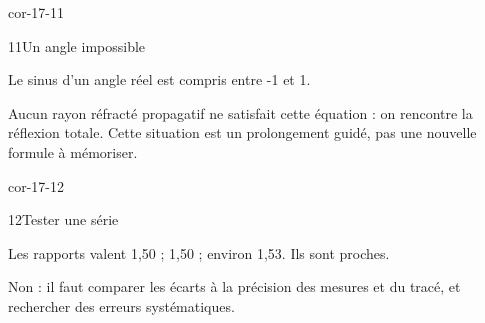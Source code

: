 \begin{blocLivre}{cor-17-11}\begin{corrige}{11}{Un angle impossible}
\begin{questions}
\item Le sinus d’un angle réel est compris entre -1 et 1.
\item Aucun rayon réfracté propagatif ne satisfait cette équation : on rencontre la réflexion totale. Cette situation est un prolongement guidé, pas une nouvelle formule à mémoriser.
\end{questions}
\end{corrige}\end{blocLivre}
\begin{blocLivre}{cor-17-12}\begin{corrige}{12}{Tester une série}
\begin{questions}
\item Les rapports valent 1,50 ; 1,50 ; environ 1,53. Ils sont proches.
\item Non : il faut comparer les écarts à la précision des mesures et du tracé, et rechercher des erreurs systématiques.
\end{questions}
\end{corrige}\end{blocLivre}

